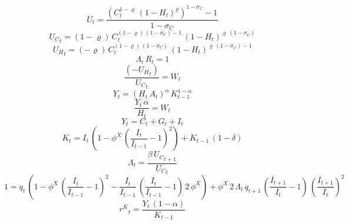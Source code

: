 \begin{dmath}
{U}_{t}=\frac{\left({C}_{t}^{1-{{\varrho}}}\, \left(1-{H}_{t}\right)^{{{\varrho}}}\right)^{1-{{\sigma_{C}}}}-1}{1-{{\sigma_{C}}}}
\end{dmath}
\begin{dmath}
{U_C}_{t}=\left(1-{{\varrho}}\right)\, {C}_{t}^{\left(1-{{\varrho}}\right)\, \left(1-{{\sigma_{C}}}\right)-1}\, \left(1-{H}_{t}\right)^{{{\varrho}}\, \left(1-{{\sigma_{C}}}\right)}
\end{dmath}
\begin{dmath}
{U_H}_{t}=\left(-{{\varrho}}\right)\, {C}_{t}^{\left(1-{{\varrho}}\right)\, \left(1-{{\sigma_{C}}}\right)}\, \left(1-{H}_{t}\right)^{{{\varrho}}\, \left(1-{{\sigma_{C}}}\right)-1}
\end{dmath}
\begin{dmath}
{\Lambda}_{t}\, {R}_{t}=1
\end{dmath}
\begin{dmath}
\frac{\left(-{U_H}_{t}\right)}{{U_C}_{t}}={W}_{t}
\end{dmath}
\begin{dmath}
{Y}_{t}=\left({H}_{t}\, {A}_{t}\right)^{{{\alpha}}}\, {K}_{t-1}^{1-{{\alpha}}}
\end{dmath}
\begin{dmath}
\frac{{Y}_{t}\, {{\alpha}}}{{H}_{t}}={W}_{t}
\end{dmath}
\begin{dmath}
{Y}_{t}={C}_{t}+{G}_{t}+{I}_{t}
\end{dmath}
\begin{dmath}
{K}_{t}={I}_{t}\, \left(1-{{\phi^X}}\, \left(\frac{{I}_{t}}{{I}_{t-1}}-1\right)^{2}\right)+{K}_{t-1}\, \left(1-{{\delta}}\right)
\end{dmath}
\begin{dmath}
{\Lambda}_{t}=\frac{{{\beta}}\, {U_C}_{t+1}}{{U_C}_{t}}
\end{dmath}
\begin{dmath}
1={q}_{t}\, \left(1-{{\phi^X}}\, \left(\frac{{I}_{t}}{{I}_{t-1}}-1\right)^{2}-\frac{{I}_{t}}{{I}_{t-1}}\, \left(\frac{{I}_{t}}{{I}_{t-1}}-1\right)\, 2\, {{\phi^X}}\right)+{{\phi^X}}\, 2\, {\Lambda}_{t}\, {q}_{t+1}\, \left(\frac{{I}_{t+1}}{{I}_{t}}-1\right)\, \left(\frac{{I}_{t+1}}{{I}_{t}}\right)^{2}
\end{dmath}
\begin{dmath}
{r^{K}}_{t}=\frac{{Y}_{t}\, \left(1-{{\alpha}}\right)}{{K}_{t-1}}
\end{dmath}
